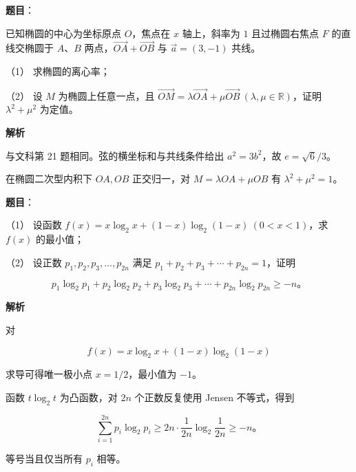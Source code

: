 \begin{answer}

\textbf{题目}：

已知椭圆的中心为坐标原点 $O$，焦点在 $x$ 轴上，斜率为 $1$ 且过椭圆右焦点 $F$ 的直线交椭圆于 $A\text{、}B$ 两点，$\overrightarrow{OA}+\overrightarrow{OB}$ 与 $\vec a=(3,-1)$ 共线。

（1） 求椭圆的离心率；

（2） 设 $M$ 为椭圆上任意一点，且 $\overrightarrow{OM}=\lambda\overrightarrow{OA}+\mu\overrightarrow{OB}\ (\lambda,\mu\in\mathbb R)$，证明 $\lambda^2+\mu^2$ 为定值。

\textbf{解析}


与文科第 21 题相同。弦的横坐标和与共线条件给出 $a^2=3b^2$，故 $e=\sqrt6/3$。


在椭圆二次型内积下 $OA,OB$ 正交归一，对 $M=\lambda OA+\mu OB$ 有 $\lambda^2+\mu^2=1$。



\end{answer}
\begin{answer}

\textbf{题目}：

（1） 设函数 $f(x)=x\log_2x+(1-x)\log_2(1-x)\ (0<x<1)$，求 $f(x)$ 的最小值；

（2） 设正数 $p_1,p_2,p_3,\ldots,p_{2n}$ 满足 $p_1+p_2+p_3+\cdots+p_{2n}=1$，证明

\nopagebreak[4]
\[
p_1\log_2p_1+p_2\log_2p_2+p_3\log_2p_3+\cdots+p_{2n}\log_2p_{2n}\geqslant-n\text{。}
\]

\textbf{解析}


对

\nopagebreak[4]
\[
f(x)=x\log_2x+(1-x)\log_2(1-x)
\]

求导可得唯一极小点 $x=1/2$，最小值为 $-1$。


函数 $t\log_2t$ 为凸函数，对 $2n$ 个正数反复使用 Jensen 不等式，得到

\nopagebreak[4]
\[
\sum_{i=1}^{2n}p_i\log_2p_i
\geqslant 2n\cdot\frac1{2n}\log_2\frac1{2n}
\geqslant-n\text{。}
\]

等号当且仅当所有 $p_i$ 相等。



\end{answer}